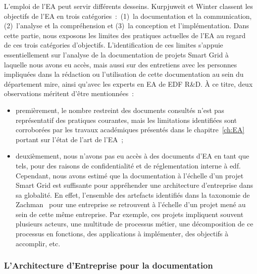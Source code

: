 
L'emploi de l'EA peut servir différents desseins. Kurpjuweit et Winter
\cite{kurpjuweit2007viewpoint} classent les objectifs de l'EA en trois
catégories~:~(1)~la documentation et la communication, (2)~l'analyse et la
compréhension et (3)~la conception et l'implémentation. Dans cette partie, nous
exposons les limites des pratiques actuelles de l'EA au regard de ces trois
catégories d'objectifs. L'identification de ces limites s'appuie
essentiellement sur l'analyse de la documentation de projets Smart Grid à
laquelle nous avons eu accès, mais aussi sur des entretiens avec les personnes
impliquées dans la rédaction ou l'utilisation de cette documentation au sein du
département \gls{mire}, ainsi qu'avec les experts en EA de EDF R\&D. À ce
titre, deux observations méritent d'être mentionnées~:

\begin{itemize}
    \item premièrement, le nombre restreint des documents consultés n'est pas
    représentatif des pratiques courantes, mais les limitations identifiées
    sont corroborées par les travaux académiques présentés dans le
    chapitre~\ref{ch:EA} portant sur l'état de l'art de l'EA~;

    \item deuxièmement, nous n'avons pas eu accès à des documents d'EA en tant
    que tels, pour des raisons de confidentialité et de réglementation interne
    à \gls{edf}. Cependant, nous avons estimé que la documentation à l'échelle
    d'un projet Smart Grid est suffisante pour appréhender une architecture
    d'entreprise dans sa globalité. En effet, l'ensemble des artefacts
    identifiés dans la taxonomie de Zachman~\cite{zachman1987framework} pour
    une entreprise se retrouvent à l'échelle d'un projet mené au sein de cette
    même entreprise.  Par exemple, ces projets impliquent souvent plusieurs
    acteurs, une multitude de processus métier, une décomposition de ce
    processus en fonctions, des applications à implémenter, des objectifs à
    accomplir, etc.
\end{itemize}

\subsubsection{L'Architecture d'Entreprise pour la documentation}

